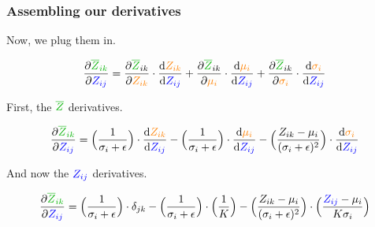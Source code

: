             

            
        \subsubsection{Assembling our derivatives}

            Now, we plug them in.

            \begin{equation}
                \pderiv{\grn{\overline{Z}_{ik}}}{\blu{Z_{ij}}} =
                \pderiv{\grn{\overline{Z}}_{ik}}{\org{Z_{ik}}} \cdot 
                \deriv{\org{Z_{ik}}}{\blu{Z_{ij}}}
                +
                \pderiv{\grn{\overline{Z}}_{ik}}{\org{\mu_i}} \cdot 
                \deriv{\org{\mu_i}}{\blu{Z_{ij}}}
                +
                \pderiv{\grn{\overline{Z}}_{ik}}{\org{\sigma_i}} \cdot 
                \deriv{\org{\sigma_i}}{\blu{Z_{ij}}}
            \end{equation}

            First, the $\grn{\overline{Z}}$ derivatives.

            \begin{equation}
                \pderiv{\grn{\overline{Z}_{ik}}}{\blu{Z_{ij}}} =
                \Big( \frac{1}{\sigma_i+\epsilon} \Big) \cdot 
                \deriv{\org{Z_{ik}}}{\blu{Z_{ij}}}
                -
                \Big( \frac{1}{\sigma_i+\epsilon} \Big) \cdot 
                \deriv{\org{\mu_i}}{\blu{Z_{ij}}}
                -
                \Big( 
                    \frac{ Z_{ik}-\mu_i  }{(\sigma_i+\epsilon)^2}
                \Big) \cdot 
                \deriv{\org{\sigma_i}}{\blu{Z_{ij}}}
            \end{equation}

            And now the $\textcolor{blue}{Z_{ij}}$ derivatives.

            \begin{equation}
                \pderiv{\grn{\overline{Z}_{ik}}}{\blu{Z_{ij}}} =
                \Big( \frac{1}{\sigma_i+\epsilon} \Big) \cdot 
                \delta_{jk}
                -
                \Big( \frac{1}{\sigma_i+\epsilon} \Big) \cdot 
                \Big( \frac{1}{K} \Big)
                -
                \Big( 
                    \frac{ Z_{ik}-\mu_i  }{(\sigma_i+\epsilon)^2}
                \Big) \cdot 
                \Big( \frac{\blu{Z_{ij}}-\mu_i}{K\sigma_i} \Big)
            \end{equation}

